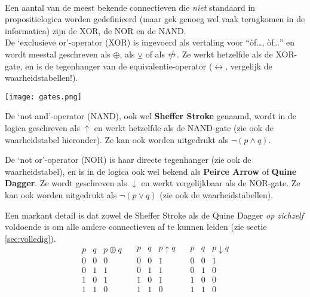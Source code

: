 \begin{aside}\label{as:andere:conn}\mbox{}\\
Een aantal van de meest bekende connectieven die \textit{niet} standaard in propositielogica worden gedefinieerd (maar gek genoeg wel vaak terugkomen in de informatica) zijn de XOR, de NOR en de NAND.\\[2.5pt]
\hspace{15pt}
De `exclusieve or'-operator (XOR) is ingevoerd als vertaling voor \enquote{\`of\ldots, \`of\ldots} en wordt meestal geschreven als $\oplus$, als $\veebar$ of als $\mathrel{\ooalign{$\leftrightarrow$\cr\hidewidth$/$\hidewidth}}$. Ze werkt hetzelfde als de XOR-gate, en is de tegenhanger van de equivalentie-operator ($\leftrightarrow$, vergelijk de waarheidstabellen!).

  \begin{marginfigure}
\texttt{[image: gates.png]}
  \end{marginfigure}

De `not and'-operator (NAND), ook wel \textbf{Sheffer Stroke} genaamd, wordt in de logica geschreven als $\uparrow$ en werkt hetzelfde als de NAND-gate (zie ook de waarheidstabel hieronder). Ze kan ook worden uitgedrukt als $\neg(p\land q)$.

De `not or'-operator (NOR) is haar directe tegenhanger (zie ook de waarheidstabel), en is in de logica ook wel bekend als \textbf{Peirce Arrow} of \textbf{Quine Dagger}. Ze wordt geschreven als $\downarrow$ en werkt vergelijkbaar als de NOR-gate. Ze kan ook worden uitgedrukt als $\neg(p\lor q)$ (zie ook de waarheidstabellen).

Een markant detail is dat zowel de Sheffer Stroke als de Quine Dagger \textit{op zichzelf} voldoende is om alle andere connectieven af te kunnen leiden (zie sectie \ref{sec:volledig}).
$$\begin{array}{ccc}
p&q&p\oplus q\\
\hline
0&0&0\\
0&1&1\\
1&0&1\\
1&1&0
\end{array}\quad
\begin{array}{ccc}
p&q&p\uparrow q\\
\hline
0&0&1\\
0&1&1\\
1&0&1\\
1&1&0
\end{array}\quad
\begin{array}{ccc}
p&q&p\downarrow q\\
\hline
0&0&1\\
0&1&0\\
1&0&0\\
1&1&0
\end{array}
$$
\end{aside}

